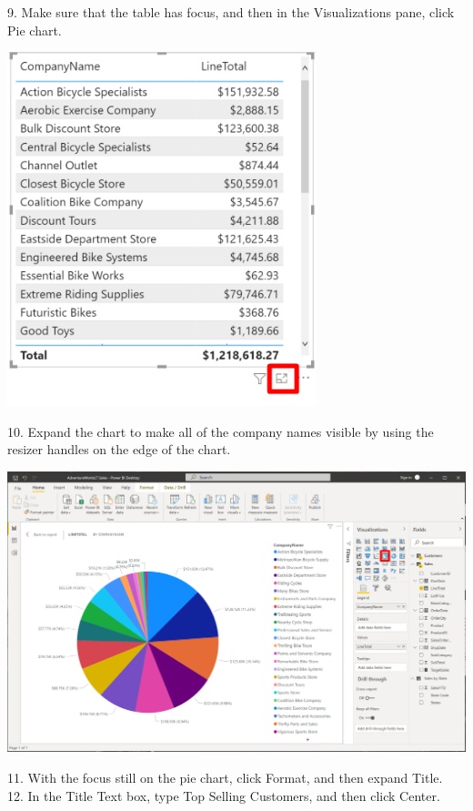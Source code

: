 \documentclass[12pt,letterpaper]{article}
\begin{document}
9. Make sure that the table has focus, and then in the Visualizations pane, click Pie chart.
\begin{center}
    \includegraphics[width=9cm]{img/80.png}
\end{center}
10. Expand the chart to make all of the company names visible by using the resizer handles on the edge
of the chart.
\begin{center}
    \includegraphics[width=17cm]{img/81.png}
\end{center}
11. With the focus still on the pie chart, click Format, and then expand Title.
\\12. In the Title Text box, type Top Selling Customers, and then click Center.
\end{document}
